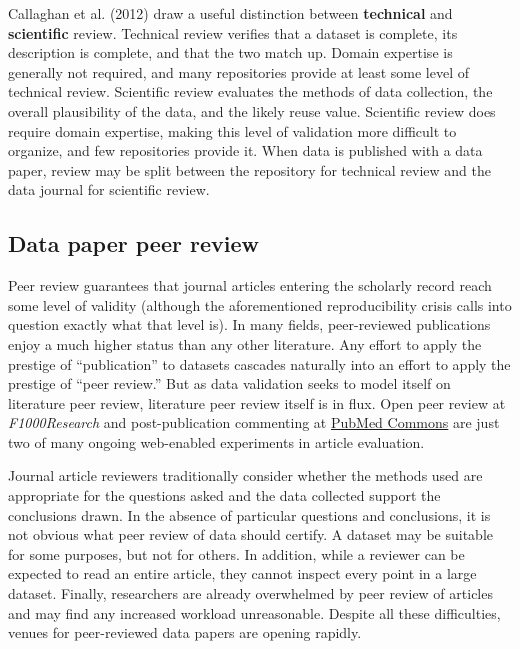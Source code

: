 \documentclass[10pt,a4paper,twocolumn]{article}
\begin{document}
{Callaghan et al. (2012)\cite{sarah_callaghan_making_2012} draw a useful distinction between \textbf{technical} and \textbf{scientific} review.
Technical review verifies that a dataset is complete, its description is complete, and that the two match up.
Domain expertise is generally not required, and many repositories provide at least some level of technical review.
Scientific review evaluates the methods of data collection, the overall plausibility of the data, and the likely reuse value.
Scientific review does require domain expertise, making this level of validation more difficult to organize, and few repositories provide it.
When data is published with a data paper, review may be split between the repository for technical review and the data journal for scientific review.

\subsection*{Data paper peer review}\label{data-paper-peer-review}

Peer review guarantees that journal articles entering the scholarly record reach some level of validity (although the aforementioned reproducibility crisis calls into question exactly what that level is).
In many fields, peer-reviewed publications enjoy a much higher status than any other literature.
Any effort to apply the prestige of ``publication'' to datasets cascades naturally into an effort to apply the prestige of ``peer review.''
But as data validation seeks to model itself on literature peer review, literature peer review itself is in flux\cite{pulverer_transparent_2010, herron_is_2012, kriegeskorte_emerging_2012}.
Open peer review at \emph{F1000Research} and post-publication commenting at \href{http://www.ncbi.nlm.nih.gov/pubmedcommons/}{PubMed Commons} are just two of many ongoing web-enabled experiments in article evaluation.

Journal article reviewers traditionally consider whether the methods used are appropriate for the questions asked and the data collected support the conclusions drawn.
In the absence of particular questions and conclusions, it is not obvious what peer review of data should certify.
A dataset may be suitable for some purposes, but not for others.\cite{parsons_data_2010}
In addition, while a reviewer can be expected to read an entire article, they cannot inspect every point in a large dataset.
Finally, researchers are already overwhelmed by peer review of articles\cite{diederich_are_2013} and may find any increased workload unreasonable.
Despite all these difficulties, venues for peer-reviewed data papers are opening rapidly.

}
\end{document}
